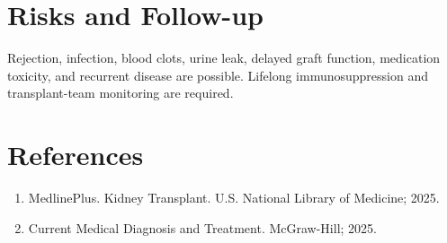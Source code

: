 \section*{Risks and Follow-up}
Rejection, infection, blood clots, urine leak, delayed graft function, medication toxicity, and recurrent disease are possible. Lifelong immunosuppression and transplant-team monitoring are required.
\section*{References}
\begin{enumerate}\item MedlinePlus. Kidney Transplant. U.S. National Library of Medicine; 2025.\item Current Medical Diagnosis and Treatment. McGraw-Hill; 2025.\end{enumerate}
\clearpage
